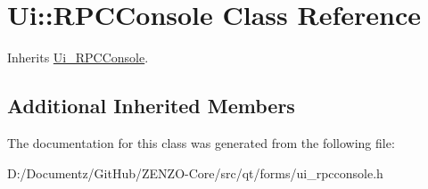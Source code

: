 \hypertarget{class_ui_1_1_r_p_c_console}{}\section{Ui\+::R\+P\+C\+Console Class Reference}
\label{class_ui_1_1_r_p_c_console}


Inherits \mbox{\hyperlink{class_ui___r_p_c_console}{Ui\+\_\+\+R\+P\+C\+Console}}.

\subsection*{Additional Inherited Members}


The documentation for this class was generated from the following file\+:\begin{DoxyCompactItemize}
\item 
D\+:/\+Documentz/\+Git\+Hub/\+Z\+E\+N\+Z\+O-\/\+Core/src/qt/forms/ui\+\_\+rpcconsole.\+h\end{DoxyCompactItemize}
